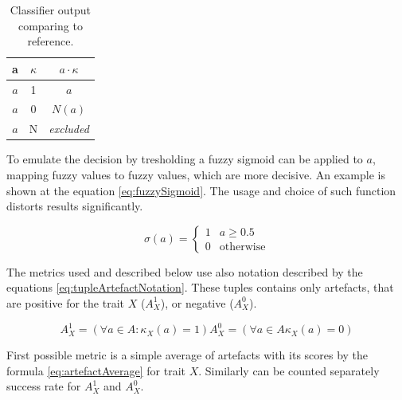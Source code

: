 \begin{table}
\begin{center}
\begin{tabular}{|c|c|c|} \hline
\textbf{a}  & \textbf{$\kappa$} & \textbf{$a \cdot \kappa$} \\ \hline
$a$         & 1               & $a$                       \\ \hline
$a$         & 0               & $N(a)$                    \\ \hline
$a$         & N               & \it{excluded}             \\ \hline
\end{tabular}
\caption{Classifier output comparing to reference.\label{table:3stateLogicOp} }
\end{center}
\end{table}

To emulate the decision by tresholding a fuzzy sigmoid can be applied to $a$,
mapping fuzzy values to fuzzy values, which are more decisive. An example is
shown at the equation \ref{eq:fuzzySigmoid}. The usage and choice of such
function distorts results significantly.

\begin{equation}
\sigma(a) = \begin{cases} 1 & a \geq 0.5 \\
            0 & \text{otherwise} \end{cases}
\label{eq:fuzzySigmoid}
\end{equation}

The metrics used and described below use also notation described by the equations
\ref{eq:tupleArtefactNotation}. These tuples contains only artefacts, that are
positive for the trait $X$ ($A_{X}^{1}$), or negative ($A_{X}^{0}$).

\begin{subequations}
\begin{equation}
A_{X}^{1} = (\forall a \in A: \kappa_{X}(a) = 1)
\end{equation}
\begin{equation}
A_{X}^{0} = (\forall a \in A \kappa_{X}(a) = 0)
\end{equation}
\label{eq:tupleArtefactNotation}
\end{subequations}

First possible metric is a simple average of artefacts with its scores by the
formula \ref{eq:artefactAverage} for trait $X$. Similarly can be counted
separately success rate for $A_{X}^{1}$ and $A_{X}^{0}$.

